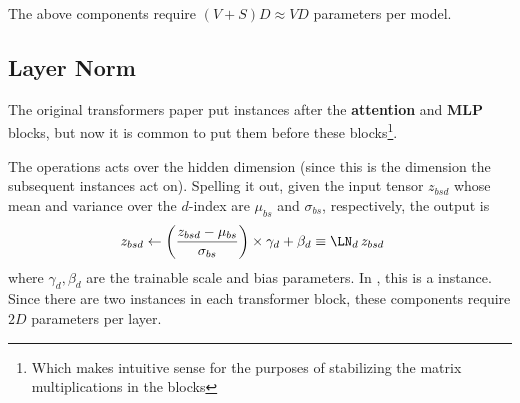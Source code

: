 The above components require $ (V+S)D \approx VD $ parameters per model.



\subsection{Layer Norm \label{subsubsec_layer_norm} }

The original transformers paper \cite{vaswani2017attention} put  instances after
the \textbf{attention} and \textbf{MLP} blocks, but now it is common \cite{xiong2020layer} to put
them before these blocks\footnote{Which makes intuitive sense for the purposes of stabilizing the
	matrix multiplications in the blocks}.

The  operations acts over the hidden dimension (since this is the dimension the
subsequent  instances act on). Spelling it out, given the input tensor $ z _{ bsd }
$ whose mean and variance over the $ d $-index are $ \mu _{ bs } $ and $ \sigma _{ bs } $,
respectively, the  output is
\begin{align}
	z _{ bsd } & \leftarrow \left ( \frac{ z _{ bsd } - \mu _{ bs } }{ \sigma _{ bs } } \right )\times \gamma _{ d }
	+ \beta _{ d } \equiv \LN_{ d }\, z _{ bsd}
\end{align}
where $ \gamma _{ d }, \beta  _{ d } $ are the trainable scale and bias parameters. In
, this is a  instance.
Since there are two  instances in each transformer block, these components require
$ 2D $ parameters per layer.

